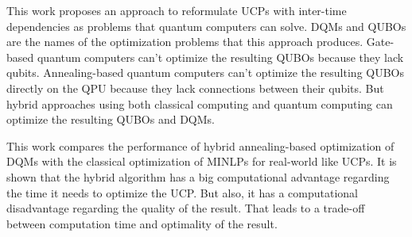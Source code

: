 This work proposes an approach to reformulate UCPs with inter-time dependencies as problems that quantum computers can solve.
DQMs and QUBOs are the names of the optimization problems that this approach produces.
Gate-based quantum computers can't optimize the resulting QUBOs because they lack qubits.
Annealing-based quantum computers can't optimize the resulting QUBOs directly on the QPU because they lack connections between their qubits.
But hybrid approaches using both classical computing and quantum computing can optimize the resulting QUBOs and DQMs.

This work compares the performance of hybrid annealing-based optimization of DQMs with the classical optimization of MINLPs for real-world like UCPs.
It is shown that the hybrid algorithm has a big computational advantage regarding the time it needs to optimize the UCP.
But also, it has a computational disadvantage regarding the quality of the result.
That leads to a trade-off between computation time and optimality of the result.
